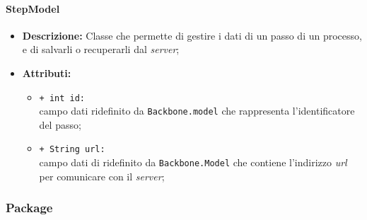 \paragraph{StepModel}
\label{stepModel}
\begin{flushleft}
\begin{itemize}
\item \textbf{Descrizione:} Classe che permette di gestire i dati di un passo di un processo, e di salvarli o recuperarli dal \textit{server};
\item \textbf{Attributi:}
\begin{sloppypar}
\begin{itemize}
\item \texttt{+ int id:}\\ campo dati ridefinito da \texttt{Backbone.model} che rappresenta l'identificatore del passo;
\item \texttt{+ String url:}\\ campo dati di ridefinito da \texttt{Backbone.Model} che contiene l'indirizzo \textit{url} per comunicare con il \textit{server};
\end{itemize}
\end{sloppypar}
\end{itemize}
\end{flushleft}

\subsubsection{Package \collection{}}

